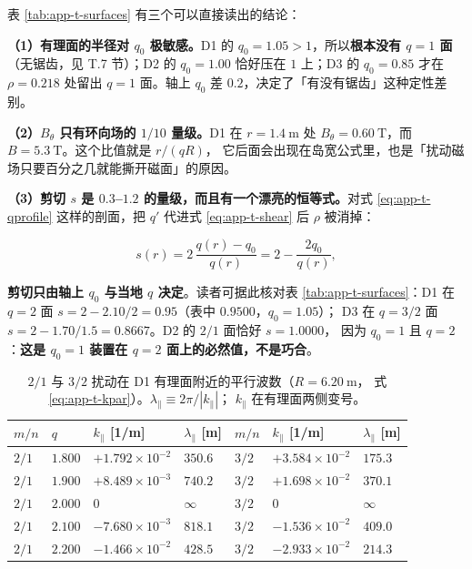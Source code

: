 表 \ref{tab:app-t-surfaces} 有三个可以直接读出的结论：

\textbf{（1）有理面的半径对 $q_0$ 极敏感。}D1 的 $q_0=1.05>1$，所以\textbf{根本没有 $q=1$ 面}
（无锯齿，见 T.7 节）；D2 的 $q_0=1.00$ 恰好压在 $1$ 上；D3 的 $q_0=0.85$ 才在
$\rho=0.218$ 处留出 $q=1$ 面。轴上 $q_0$ 差 $0.2$，决定了「有没有锯齿」这种定性差别。

\textbf{（2）$B_\theta$ 只有环向场的 $1/10$ 量级。}D1 在 $r=1.4\ \mathrm{m}$ 处
$B_\theta=0.60\ \mathrm{T}$，而 $B=5.3\ \mathrm{T}$。这个比值就是 $r/(qR)$，
它后面会出现在岛宽公式里，也是「扰动磁场只要百分之几就能撕开磁面」的原因。

\textbf{（3）剪切 $s$ 是 $0.3$--$1.2$ 的量级，而且有一个漂亮的恒等式。}对式
\eqref{eq:app-t-qprofile} 这样的剖面，把 $q'$ 代进式 \eqref{eq:app-t-shear} 后
$\rho$ 被消掉：

\begin{equation}
s(r)=2\,\frac{q(r)-q_0}{q(r)}=2-\frac{2q_0}{q(r)} ,
\label{eq:app-t-sidentity}
\end{equation}

\textbf{剪切只由轴上 $q_0$ 与当地 $q$ 决定}。读者可据此核对表
\ref{tab:app-t-surfaces}：D1 在 $q=2$ 面 $s=2-2.10/2=0.95$（表中 $0.9500$，$q_0=1.05$）；
D3 在 $q=3/2$ 面 $s=2-1.70/1.5=0.8667$。D2 的 $2/1$ 面恰好 $s=1.0000$，
因为 $q_0=1$ 且 $q=2$：\textbf{这是 $q_0=1$ 装置在 $q=2$ 面上的必然值，不是巧合}。

\begin{table}[htbp]
  \centering
  \caption{$2/1$ 与 $3/2$ 扰动在 D1 有理面附近的平行波数（$R=6.20\ \mathrm{m}$，
    式 \eqref{eq:app-t-kpar}）。$\lambda_\parallel\equiv 2\pi/|k_\parallel|$；
    $k_\parallel$ 在有理面两侧变号。}
  \label{tab:app-t-kpar}
  \begin{tabular}{@{}p{1.3cm}p{1.5cm}p{2.9cm}p{2.3cm}p{1.3cm}p{2.9cm}p{2.3cm}@{}}
    \toprule
    $m/n$ & $q$ & $k_\parallel$ [1/m] & $\lambda_\parallel$ [m] & $m/n$ & $k_\parallel$ [1/m] & $\lambda_\parallel$ [m] \\
    \midrule
    $2/1$ & $1.800$ & $+1.792\times10^{-2}$ & $350.6$ & $3/2$ & $+3.584\times10^{-2}$ & $175.3$ \\
    $2/1$ & $1.900$ & $+8.489\times10^{-3}$ & $740.2$ & $3/2$ & $+1.698\times10^{-2}$ & $370.1$ \\
    $2/1$ & $2.000$ & $0$ & $\infty$ & $3/2$ & $0$ & $\infty$ \\
    $2/1$ & $2.100$ & $-7.680\times10^{-3}$ & $818.1$ & $3/2$ & $-1.536\times10^{-2}$ & $409.0$ \\
    $2/1$ & $2.200$ & $-1.466\times10^{-2}$ & $428.5$ & $3/2$ & $-2.933\times10^{-2}$ & $214.3$ \\
    \bottomrule
  \end{tabular}
\end{table}

